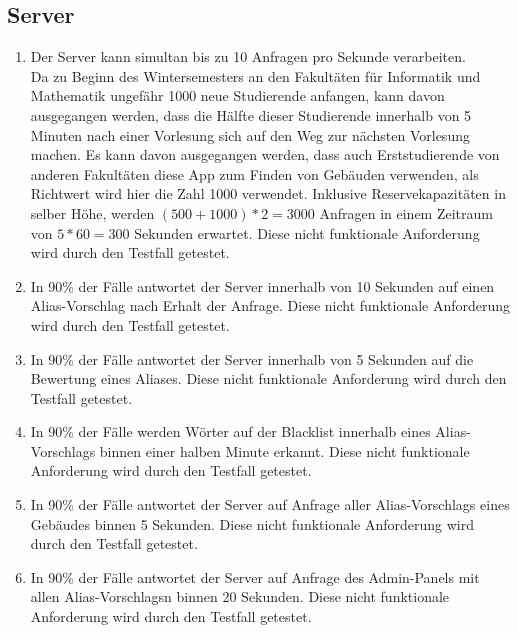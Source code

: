 \subsection*{Server}

\begin{samepage}
    \begin{enumerate}[label=\textbf{/NFL\arabic*0/}, align=left, start=12]
        \item \label{/NFL120/} Der \Gls{Server} kann \gls{simultan} bis zu 10 Anfragen pro Sekunde verarbeiten. \\
              Da zu Beginn des Wintersemesters an den Fakultäten für Informatik und Mathematik ungefähr 1000 neue Studierende anfangen,
              kann davon ausgegangen werden, dass die Hälfte dieser Studierende innerhalb von 5 Minuten nach einer Vorlesung sich auf den Weg zur nächsten Vorlesung machen.
              Es kann davon ausgegangen werden, dass auch Erststudierende von anderen Fakultäten diese App zum Finden von Gebäuden verwenden, als Richtwert wird hier die Zahl 1000 verwendet.
              Inklusive Reservekapazitäten in selber Höhe, werden $(500 + 1000) * 2 = 3000$ Anfragen in einem Zeitraum von $5 * 60 = 300$ Sekunden erwartet.
              Diese nicht funktionale Anforderung wird durch den Testfall  getestet.
        \item \label{/NFL130/} In 90\% der Fälle antwortet der \Gls{Server} innerhalb von 10 Sekunden auf einen \Gls{Alias-Vorschlag} nach Erhalt der Anfrage. Diese nicht funktionale Anforderung wird durch den Testfall  getestet.
        \item \label{/NFL140/} In 90\% der Fälle antwortet der \Gls{Server} innerhalb von 5 Sekunden auf die Bewertung eines Aliases. Diese nicht funktionale Anforderung wird durch den Testfall  getestet.
        \item \label{/NFL150/} In 90\% der Fälle werden Wörter auf der \Gls{Blacklist} innerhalb eines \Gls{Alias-Vorschlag}s binnen einer halben Minute erkannt. Diese nicht funktionale Anforderung wird durch den Testfall  getestet.
        \item \label{/NFL160/} In 90\% der Fälle antwortet der \Gls{Server} auf Anfrage aller \Glspl{Alias-Vorschlag} eines Gebäudes binnen 5 Sekunden. Diese nicht funktionale Anforderung wird durch den Testfall  getestet.
        \item \label{/NFL170/} In 90\% der Fälle antwortet der \Gls{Server} auf Anfrage des \Gls{Admin-Panel}s mit allen \Glspl{Alias-Vorschlag}n binnen 20 Sekunden. Diese nicht funktionale Anforderung wird durch den Testfall  getestet.
    \end{enumerate}
\end{samepage}
